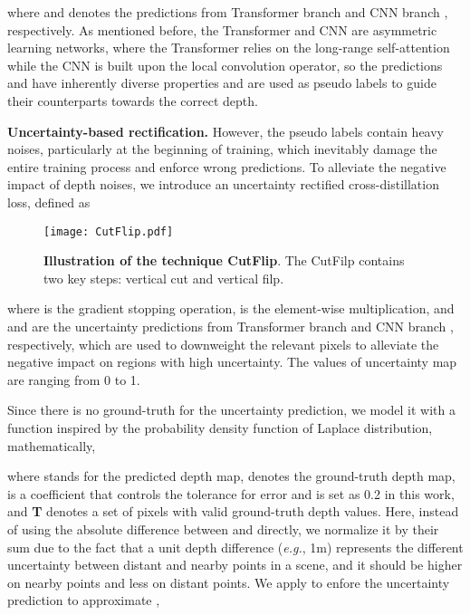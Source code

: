 \documentclass[letterpaper]{article} \usepackage{aaai23}  \usepackage{times}  \usepackage{helvet}  \usepackage{courier}  \usepackage[hyphens]{url}  \usepackage{graphicx} \urlstyle{rm} \def\UrlFont{\rm}  \usepackage{natbib}  \usepackage{caption} \frenchspacing  \setlength{\pdfpagewidth}{8.5in} \setlength{\pdfpageheight}{11in} \usepackage{algorithm}
\begin{document}
where  and  denotes the predictions from Transformer branch  and CNN branch , respectively. As mentioned before, the Transformer and CNN are asymmetric learning networks, where the Transformer relies on the long-range self-attention while the CNN is built upon the local convolution operator, so the predictions  and  have inherently diverse properties and are used as pseudo labels to guide their counterparts towards the correct depth. 



\textbf{Uncertainty-based rectification.} However, the pseudo labels contain heavy noises, particularly at the beginning of training, which inevitably damage the entire training process and enforce wrong predictions. To alleviate the negative impact of depth noises, we introduce an uncertainty rectified cross-distillation loss, defined as

\begin{figure}[!htb]
\centering
	\texttt{[image: CutFlip.pdf]}\caption{\textbf{Illustration of the technique CutFlip}. The CutFilp contains two key steps: vertical cut and vertical filp. }
	\label{Fig3}
\end{figure}
where  is the gradient stopping operation,  is the element-wise multiplication, and  and  are the uncertainty predictions from Transformer branch  and CNN branch , respectively, which are used to downweight the relevant pixels to alleviate the negative impact on regions with high uncertainty. The values of uncertainty map are ranging from 0 to 1.


Since there is no ground-truth for the uncertainty prediction, we model it with a function inspired by the probability density function of Laplace distribution, mathematically,

where  stands for the predicted depth map,  denotes the ground-truth depth map,  is a coefficient that controls the tolerance for error and is set as 0.2 in this work, and \textbf{T} denotes a set of pixels with valid ground-truth depth values. Here, instead of using the absolute difference between  and  directly, we normalize it by their sum due to the fact that a unit depth difference (\textit{e.g.}, 1m) represents the different uncertainty between distant and nearby points in a scene, and it should be higher on nearby points and less on distant points. We apply  to enfore the uncertainty prediction to approximate ,
\end{document}
